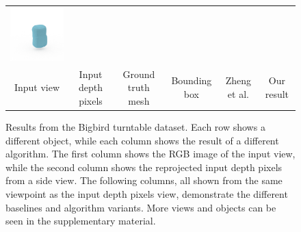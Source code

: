 \documentclass[10pt,twocolumn,letterpaper]{article}
\makeatletter
\newcommand*{\ea}{et al.\@\xspace}
\makeatother
\begin{document}
\begin{figure}
\begin{tabular}{cccccc}
\includegraphics[height=\turnheight, clip=true, trim=60 30 30 60]{data/renders_turn_table/pop_tarts_strawberry_NP3_0.mat_oma_view_90} \\
     Input view & Input depth pixels & Ground truth mesh & Bounding box &  Zheng \ea & Our result \\
    \end{tabular}
    \vspace{5pt}
     \caption{Results from the Bigbird turntable dataset.
     Each row shows a different object, while each column shows the result of a different algorithm.
      The first column shows the RGB image of the input view, while the second column shows the reprojected input depth pixels from a side view.
     The following columns, all shown from the same viewpoint as the input depth pixels view, demonstrate the different baselines and algorithm variants.
      More views and objects can be seen in the supplementary material.
     \label{fig:turntable_qual}
     }
\end{figure}


\end{document}
